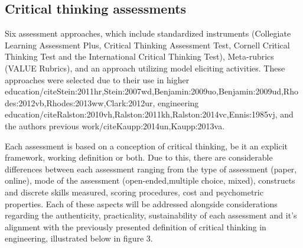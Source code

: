 \subsection{Critical thinking assessments}

Six assessment approaches, which include standardized instruments (Collegiate Learning Assessment Plus, Critical Thinking Assessment Test, Cornell Critical Thinking Test and the International Critical Thinking Test), Meta-rubrics (VALUE Rubrics), and an approach utilizing model eliciting activities.  These approaches were selected due to their use in higher education/cite{Stein:2011hr,Stein:2007wd,Benjamin:2009uo,Benjamin:2009ud,Rhodes:2012vb,Rhodes:2013ww,Clark:2012ur}, engineering education/cite{Ralston:2010vh,Ralston:2011kh,Ralston:2014vc,Ennis:1985vj}, and the authors previous work/cite{Kaupp:2014un,Kaupp:2013va}.

Each assessment is based on a conception of critical thinking, be it an explicit framework, working definition or both.  Due to this, there are considerable differences between each assessment ranging from the type of assessment (paper, online), mode of the assessment (open-ended,multiple choice, mixed), constructs and discrete skills measured, scoring procedures, cost and psychometric properties.  Each of these aspects will be addressed alongside considerations regarding the  authenticity, practicality, sustainability of each assessment and it's alignment with the previously presented definition of critical thinking in engineering, illustrated below in figure 3.
